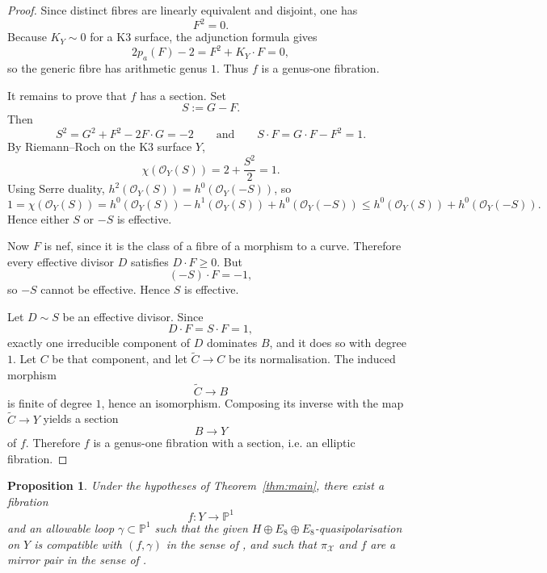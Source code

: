 \documentclass[11pt]{article}
\newtheorem{proposition}[theorem]{Proposition}
\newcommand{\PP}{\mathbb{P}}
\begin{document}
\begin{proof}
Since distinct fibres are linearly equivalent and disjoint, one has
\[
F^2=0.
\]
Because $K_Y\sim 0$ for a K3 surface, the adjunction formula gives
\[
2p_a(F)-2 = F^2 + K_Y\cdot F = 0,
\]
so the generic fibre has arithmetic genus $1$. Thus $f$ is a genus-one fibration.

It remains to prove that $f$ has a section. Set
\[
S:=G-F.
\]
Then
\[
S^2 = G^2 + F^2 - 2F\cdot G = -2
\qquad\text{and}\qquad
S\cdot F = G\cdot F - F^2 = 1.
\]
By Riemann--Roch on the K3 surface $Y$,
\[
\chi(\mathcal O_Y(S))=2+\frac{S^2}{2}=1.
\]
Using Serre duality, $h^2(\mathcal O_Y(S))=h^0(\mathcal O_Y(-S))$, so
\[
1=\chi(\mathcal O_Y(S))
= h^0(\mathcal O_Y(S)) - h^1(\mathcal O_Y(S)) + h^0(\mathcal O_Y(-S))
\le h^0(\mathcal O_Y(S)) + h^0(\mathcal O_Y(-S)).
\]
Hence either $S$ or $-S$ is effective.

Now $F$ is nef, since it is the class of a fibre of a morphism to a curve. Therefore every effective divisor $D$ satisfies $D\cdot F\ge 0$. But
\[
(-S)\cdot F = -1,
\]
so $-S$ cannot be effective. Hence $S$ is effective.

Let $D\sim S$ be an effective divisor. Since
\[
D\cdot F = S\cdot F = 1,
\]
exactly one irreducible component of $D$ dominates $B$, and it does so with degree $1$. Let $C$ be that component, and let $\widetilde C\to C$ be its normalisation. The induced morphism
\[
\widetilde C \longrightarrow B
\]
is finite of degree $1$, hence an isomorphism. Composing its inverse with the map $\widetilde C\to Y$ yields a section
\[
B\longrightarrow Y
\]
of $f$. Therefore $f$ is a genus-one fibration with a section, i.e. an elliptic fibration.
\end{proof}

\begin{proposition}\label{prop:GT}
Under the hypotheses of Theorem~\ref{thm:main}, there exist a fibration
\[
f\colon Y\to \PP^1
\]
and an allowable loop $\gamma\subset \PP^1$ such that the given $H\oplus E_8\oplus E_8$-quasipolarisation on $Y$ is compatible with $(f,\gamma)$ in the sense of \cite[Definition~4.21]{GT24}, and such that $\pi_{\mathcal X}$ and $f$ are a mirror pair in the sense of \cite[Definition~5.1]{GT24}.
\end{proposition}
\end{document}
